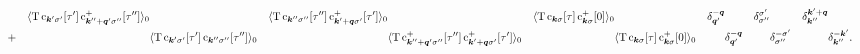 \begin{align*}
        && \langle\mathrm T \, \mathrm c_{\boldsymbol k' \sigma'}[\tau']
        \, \mathrm c_{\boldsymbol k'' + \boldsymbol q' \sigma''}^+[\tau'']\rangle_0
        && \langle\mathrm T \, \mathrm c_{\boldsymbol k'' \sigma''}[\tau'']
        \, \mathrm c_{\boldsymbol k' + \boldsymbol q \sigma'}^+[\tau']\rangle_0
        && \langle\mathrm T \, \mathrm c_{\boldsymbol k \sigma}[\tau]
        \, \mathrm c_{\boldsymbol k \sigma}^+[0]\rangle_0
        && \delta_{\boldsymbol q'}^{-\boldsymbol q}
        && \delta_{\sigma''}^{\sigma'}
        && \delta_{\boldsymbol k''}^{\boldsymbol k' + \boldsymbol q} \\
        &+
        && \langle\mathrm T \, \mathrm c_{\boldsymbol k' \sigma'}[\tau']
        \, \mathrm c_{\boldsymbol k'' \sigma''}[\tau'']\rangle_0
        && \langle\mathrm T \, \mathrm c_{\boldsymbol k'' + \boldsymbol q' \sigma''}^+[\tau'']
        \, \mathrm c_{\boldsymbol k' + \boldsymbol q \sigma'}^+[\tau']\rangle_0
        && \langle\mathrm T \, \mathrm c_{\boldsymbol k \sigma}[\tau]
        \, \mathrm c_{\boldsymbol k \sigma}^+[0]\rangle_0
        && \delta_{\boldsymbol q'}^{-\boldsymbol q}
        && \delta_{\sigma''}^{-\sigma'}
        && \delta_{\boldsymbol k''}^{-\boldsymbol k'}.
    \end{align*}
\endgroup

